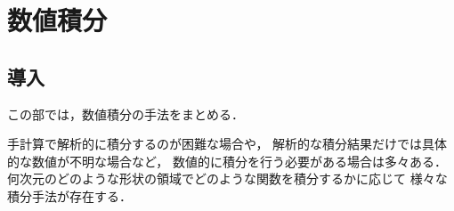 %

\part{数値積分}\label{part:integration}

\chapter{導入}

この部では，数値積分の手法をまとめる．

手計算で解析的に積分するのが困難な場合や，
解析的な積分結果だけでは具体的な数値が不明な場合など，
数値的に積分を行う必要がある場合は多々ある．
何次元のどのような形状の領域でどのような関数を積分するかに応じて
様々な積分手法が存在する．





